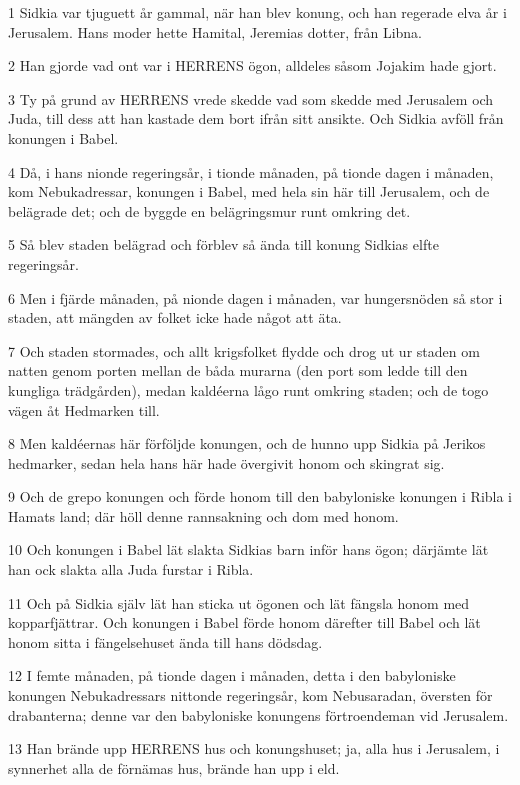 \par 1 Sidkia var tjuguett år gammal, när han blev konung, och han regerade elva år i Jerusalem. Hans moder hette Hamital, Jeremias dotter, från Libna.
\par 2 Han gjorde vad ont var i HERRENS ögon, alldeles såsom Jojakim hade gjort.
\par 3 Ty på grund av HERRENS vrede skedde vad som skedde med Jerusalem och Juda, till dess att han kastade dem bort ifrån sitt ansikte. Och Sidkia avföll från konungen i Babel.
\par 4 Då, i hans nionde regeringsår, i tionde månaden, på tionde dagen i månaden, kom Nebukadressar, konungen i Babel, med hela sin här till Jerusalem, och de belägrade det; och de byggde en belägringsmur runt omkring det.
\par 5 Så blev staden belägrad och förblev så ända till konung Sidkias elfte regeringsår.
\par 6 Men i fjärde månaden, på nionde dagen i månaden, var hungersnöden så stor i staden, att mängden av folket icke hade något att äta.
\par 7 Och staden stormades, och allt krigsfolket flydde och drog ut ur staden om natten genom porten mellan de båda murarna (den port som ledde till den kungliga trädgården), medan kaldéerna lågo runt omkring staden; och de togo vägen åt Hedmarken till.
\par 8 Men kaldéernas här förföljde konungen, och de hunno upp Sidkia på Jerikos hedmarker, sedan hela hans här hade övergivit honom och skingrat sig.
\par 9 Och de grepo konungen och förde honom till den babyloniske konungen i Ribla i Hamats land; där höll denne rannsakning och dom med honom.
\par 10 Och konungen i Babel lät slakta Sidkias barn inför hans ögon; därjämte lät han ock slakta alla Juda furstar i Ribla.
\par 11 Och på Sidkia själv lät han sticka ut ögonen och lät fängsla honom med kopparfjättrar. Och konungen i Babel förde honom därefter till Babel och lät honom sitta i fängelsehuset ända till hans dödsdag.
\par 12 I femte månaden, på tionde dagen i månaden, detta i den babyloniske konungen Nebukadressars nittonde regeringsår, kom Nebusaradan, översten för drabanterna; denne var den babyloniske konungens förtroendeman vid Jerusalem.
\par 13 Han brände upp HERRENS hus och konungshuset; ja, alla hus i Jerusalem, i synnerhet alla de förnämas hus, brände han upp i eld.
